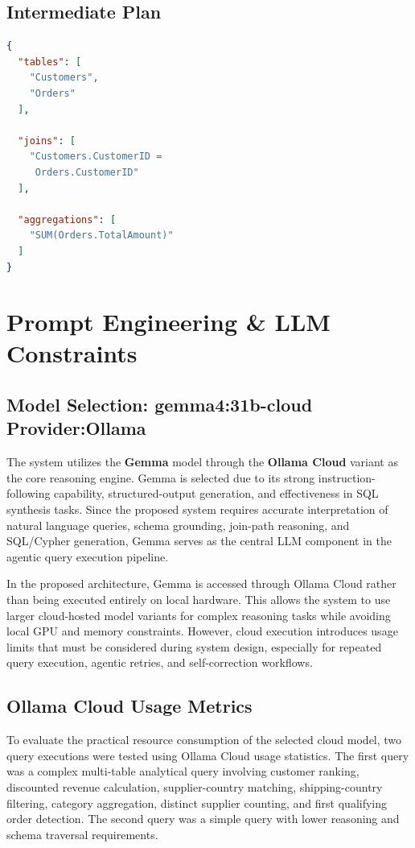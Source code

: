 \documentclass[11pt,a4paper]{article}
\begin{document}
\subsection{Intermediate Plan}

\begin{lstlisting}[language=json]
{
  "tables": [
    "Customers",
    "Orders"
  ],

  "joins": [
    "Customers.CustomerID =
     Orders.CustomerID"
  ],

  "aggregations": [
    "SUM(Orders.TotalAmount)"
  ]
}
\end{lstlisting}

\section{Prompt Engineering \& LLM Constraints}

\subsection{Model Selection: gemma4:31b-cloud Provider:Ollama}

The system utilizes the \textbf{Gemma} model through the \textbf{Ollama Cloud} variant as the core reasoning engine. Gemma is selected due to its strong instruction-following capability, structured-output generation, and effectiveness in SQL synthesis tasks. Since the proposed system requires accurate interpretation of natural language queries, schema grounding, join-path reasoning, and SQL/Cypher generation, Gemma serves as the central LLM component in the agentic query execution pipeline.

In the proposed architecture, Gemma is accessed through Ollama Cloud rather than being executed entirely on local hardware. This allows the system to use larger cloud-hosted model variants for complex reasoning tasks while avoiding local GPU and memory constraints. However, cloud execution introduces usage limits that must be considered during system design, especially for repeated query execution, agentic retries, and self-correction workflows.

\subsection{Ollama Cloud Usage Metrics}

To evaluate the practical resource consumption of the selected cloud model, two query executions were tested using Ollama Cloud usage statistics. The first query was a complex multi-table analytical query involving customer ranking, discounted revenue calculation, supplier-country matching, shipping-country filtering, category aggregation, distinct supplier counting, and first qualifying order detection. The second query was a simple query with lower reasoning and schema traversal requirements.
\end{document}
